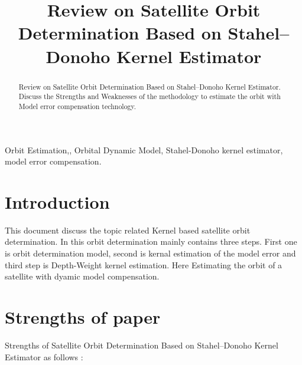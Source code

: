 \documentclass[conference]{IEEEtran}
\begin{document}
\title{Review on Satellite Orbit Determination Based on Stahel–Donoho Kernel Estimator\\

}

\author{
}

\maketitle

\begin{abstract}
Review on Satellite Orbit Determination Based on Stahel–Donoho Kernel Estimator. Discuss the Strengths and Weaknesses of the methodology to estimate the orbit with Model error compensation technology.  
\end{abstract}

\begin{IEEEkeywords}
Orbit Estimation,, Orbital Dynamic Model, Stahel-Donoho kernel estimator, model error
compensation. 
\end{IEEEkeywords}

\section{Introduction}
This document discuss the topic related Kernel based satellite orbit determination. In this orbit determination mainly contains three steps. First one is orbit determination model, second is kernal estimation of the model error and third step is Depth-Weight kernel estimation. Here Estimating the orbit of a satellite with dyamic model compensation.    

\section{Strengths of paper \cite{pan2009satellite}}

Strengths of Satellite Orbit Determination Based on Stahel–Donoho Kernel Estimator as follows :
\end{document}
